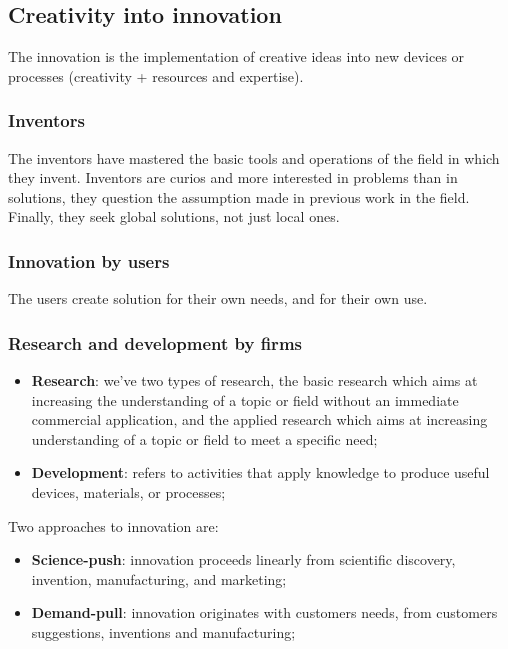 \documentclass[12pt]{article}
\begin{document}
\subsection{Creativity into innovation}
The innovation is the implementation of creative ideas into new devices or processes (creativity + resources and expertise).
\subsubsection{Inventors}
The inventors have mastered the basic tools and operations of the field in which they invent.
Inventors are curios and more interested in problems than in solutions, they question the assumption made in previous work in the field.
Finally, they seek global solutions, not just local ones.
\subsubsection{Innovation by users}
The users create solution for their own needs, and for their own use.
\subsubsection{Research and development by firms}
\begin{itemize}
    \item \textbf{Research}: we've two types of research, the basic research which aims at increasing the understanding of a topic or field without an immediate commercial application, 
    and the applied research which aims at increasing understanding of a topic or field to meet a specific need;
    \item \textbf{Development}: refers to activities that apply knowledge to produce useful devices, materials, or processes;
\end{itemize}
Two approaches to innovation are:
\begin{itemize}
    \item \textbf{Science-push}: innovation proceeds linearly from scientific discovery, invention, manufacturing, and marketing;
    \item \textbf{Demand-pull}: innovation originates with customers needs, from customers suggestions, inventions and manufacturing;
\end{itemize}
\end{document}
